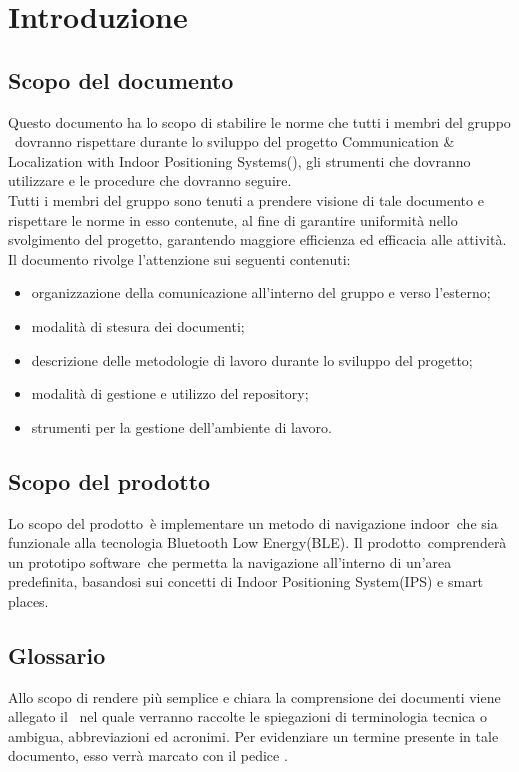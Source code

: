 \documentclass[../NormeProgetto.tex]{subfiles}
\begin{document}
\section{Introduzione}
	\subsection{Scopo del documento}
	Questo documento ha lo scopo di stabilire le norme che tutti i membri del gruppo \leaf\ dovranno rispettare durante lo sviluppo del progetto Communication \& Localization with Indoor Positioning Systems(\progetto\g), gli strumenti che dovranno utilizzare e le procedure che dovranno seguire. \\
	Tutti i membri del gruppo sono tenuti a prendere visione di tale documento e rispettare le norme in esso contenute, al fine di garantire uniformità nello svolgimento del progetto, garantendo maggiore efficienza ed efficacia alle attività. \\
	Il documento rivolge l'attenzione sui seguenti contenuti:
	\begin{itemize}
	\item organizzazione della comunicazione all'interno del gruppo e verso l'esterno;
	\item modalità di stesura dei documenti;
	\item descrizione delle metodologie di lavoro durante lo sviluppo del progetto;
	\item modalità di gestione e utilizzo del repository\g;
	\item strumenti per la gestione dell'ambiente di lavoro.
	\end{itemize}

	\subsection{Scopo del prodotto}
	Lo scopo del prodotto\g\ è implementare un metodo di navigazione indoor\g\ che sia funzionale alla tecnologia Bluetooth Low Energy(BLE\g).
	Il prodotto\g\ comprenderà un prototipo software\g\ che permetta la navigazione all’interno di un’area predefinita, basandosi sui concetti di Indoor Positioning System(IPS\g) e smart places\g.

	\subsection{Glossario}
	Allo scopo di rendere più semplice e chiara la comprensione dei documenti viene allegato il \glossariov\ nel quale verranno raccolte le spiegazioni di  terminologia tecnica o  ambigua, abbreviazioni ed acronimi. Per evidenziare un termine presente in tale documento, esso verrà marcato con il pedice \g.
\end{document}
